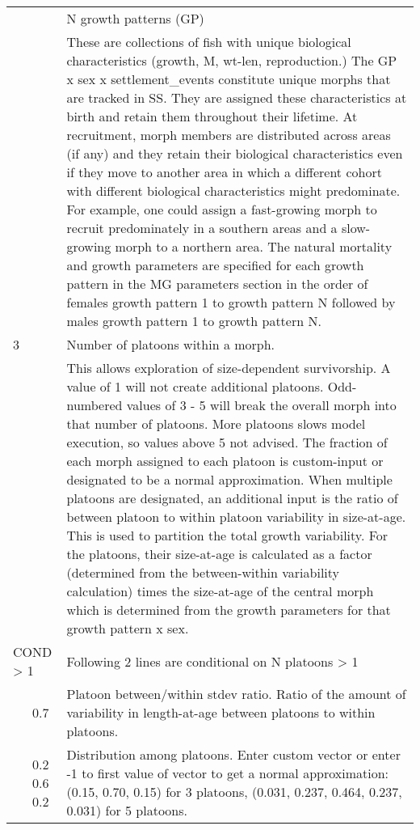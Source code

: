 \begin{center}
\begin{longtable}{p{0.5cm} p{2cm} p{12cm}}
		\pagebreak
		2 & & N growth patterns (GP)\\
		& & These are collections of fish with unique biological characteristics (growth, M, wt-len, reproduction.)  The GP x sex x settlement\_events constitute unique morphs that are tracked in SS.  They are assigned these characteristics at birth and retain them throughout their lifetime.  At recruitment, morph members are distributed across areas (if any) and they retain their biological characteristics even if they move to another area in which a different cohort with different biological characteristics might predominate.  For example, one could assign a fast-growing morph to recruit predominately in a southern areas and a slow-growing morph to a northern area.  The natural mortality and growth parameters are specified for each growth pattern in the MG parameters section in the order of females growth pattern 1 to growth pattern N followed by males growth pattern 1 to growth pattern N.\\
		\hline
		3 & & Number of platoons within a morph.\\
		& & This allows exploration of size-dependent survivorship. A value of 1 will not create additional platoons.  Odd-numbered values of 3 - 5 will break the overall morph into that number of platoons.  More platoons slows model execution, so values above 5 not advised.  The fraction of each morph assigned to each platoon is custom-input or designated to be a normal approximation.  When multiple platoons are designated, an additional input is the ratio of between platoon to within platoon variability in size-at-age.  This is used to partition the total growth variability.  For the platoons, their size-at-age is calculated as a factor (determined from the between-within variability calculation) times the size-at-age of the central morph which is determined from the growth parameters for that growth pattern x sex.\\

		\multicolumn{2}{l}{COND > 1}& \multicolumn{1}{l}{\parbox{12cm}{Following 2 lines are conditional on N platoons > 1}} \\

		& 0.7 & Platoon between/within stdev ratio. Ratio of the amount of variability in length-at-age between platoons to within platoons.\\

		& 0.2 0.6 0.2 & Distribution among platoons. Enter custom vector or enter -1 to first value of vector to get a normal approximation: (0.15, 0.70, 0.15) for 3 platoons, (0.031, 0.237, 0.464, 0.237, 0.031) for 5 platoons.\\
		\hline
	\end{longtable}
\end{center}


